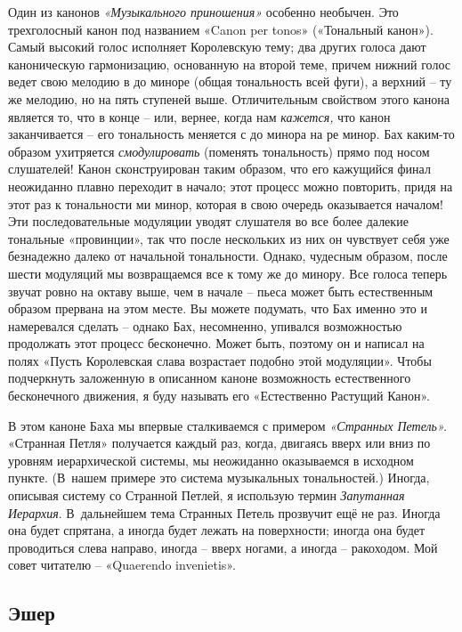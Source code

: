 \documentclass[../main.tex]{subfiles}
\begin{document}
Один из канонов \emph{«Музыкального приношения»} особенно необычен. Это трехголосный канон под названием «Canon per tonos» («Тональный канон»). Самый высокий голос исполняет Королевскую тему; два других голоса дают каноническую гармонизацию, основанную на второй теме, причем нижний голос ведет свою мелодию в до миноре (общая тональность всей фуги), а верхний \--- ту же мелодию, но на пять ступеней выше. Отличительным свойством этого канона является то, что в конце \--- или, вернее, когда нам \emph{кажется,} что канон заканчивается \--- его тональность меняется с до минора на ре минор. Бах каким-то образом ухитряется \emph{смодулировать} (поменять тональность) прямо под носом слушателей! Канон сконструирован таким образом, что его кажущийся финал неожиданно плавно переходит в начало; этот процесс можно повторить, придя на этот раз к тональности ми минор, которая в свою очередь оказывается началом! Эти последовательные модуляции уводят слушателя во все более далекие тональные «провинции», так что после нескольких из них он чувствует себя уже безнадежно далеко от начальной тональности. Однако, чудесным образом, после шести модуляций мы возвращаемся все к тому же до минору. Все голоса теперь звучат ровно на октаву выше, чем в начале \--- пьеса может быть естественным образом прервана на этом месте. Вы можете подумать, что Бах именно это и намеревался сделать \--- однако Бах, несомненно, упивался возможностью продолжать этот процесс бесконечно. Может быть, поэтому он и написал на полях «Пусть Королевская слава возрастает подобно этой модуляции». Чтобы подчеркнуть заложенную в описанном каноне возможность естественного бесконечного движения, я буду называть его «Естественно Растущий Канон».

В этом каноне Баха мы впервые сталкиваемся с примером \emph{«Странных Петель».} «Странная Петля» получается каждый раз, когда, двигаясь вверх или вниз по уровням иерархической системы, мы неожиданно оказываемся в исходном пункте. (В~нашем примере это система музыкальных тональностей.) Иногда, описывая систему со Странной Петлей, я использую термин \emph{Запутанная Иерархия}. В~дальнейшем тема Странных Петель прозвучит ещё не раз. Иногда она будет спрятана, а иногда будет лежать на поверхности; иногда она будет проводиться слева направо, иногда \--- вверх ногами, а иногда \--- ракоходом. Мой совет читателю \--- «Quaerendo invenietis».


\subsection{Эшер}
\end{document}
